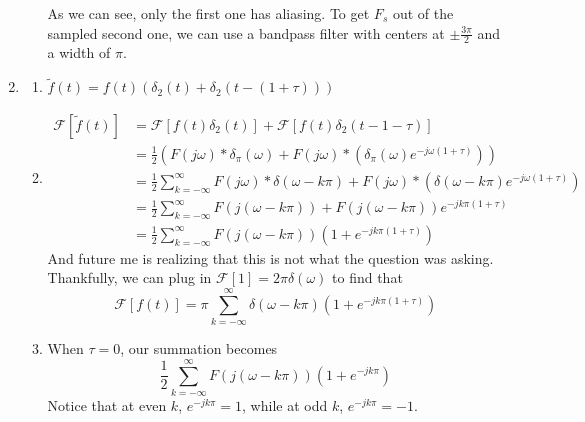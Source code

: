 \documentclass[12pt]{article}
\newcommand{\ft}[1]{\mathcal{F}\left[#1\right]}
\begin{document}
\begin{enumerate}
\begin{enumerate}
                        As we can see, only the first one has aliasing.
                        To get $F_s$ out of the sampled second one, we can use a bandpass
                        filter with centers at $\pm \frac{3\pi}{2}$ and a width of $\pi$.
            \end{enumerate}
      \item \begin{enumerate}
                  \item $\tilde{f}(t)=f(t)(\delta_2(t)+\delta_2(t-(1+\tau)))$
                  \item \[\begin{aligned}
                                    \ft{\tilde{f}(t)}
                                     & = \ft{f(t)\delta_2(t)}+\ft{f(t)\delta_2(t-1-\tau)}                                                                                           \\
                                     & = \frac{1}{2} \left(F(j\omega) * \delta_{\pi}(\omega)+F(j\omega) * \left(\delta_{\pi}(\omega)e^{-j\omega(1+\tau)}\right)\right)              \\
                                     & = \frac{1}{2} \sum_{k=-\infty}^{\infty} F(j\omega) * \delta(\omega-k\pi) + F(j\omega) * \left(\delta(\omega-k\pi)e^{-j\omega(1+\tau)}\right) \\
                                     & = \frac{1}{2} \sum_{k=-\infty}^{\infty} F(j(\omega-k\pi))+F(j(\omega-k\pi))e^{-jk\pi(1+\tau)}                                                \\
                                     & = \frac{1}{2} \sum_{k=-\infty}^{\infty} F(j(\omega-k\pi))\left(1+e^{-jk\pi(1+\tau)}\right)
                              \end{aligned}\] \label{list:2b}
                              And future me is realizing that this is not what the question was asking.
                              Thankfully, we can plug in $\ft{1}=2\pi\delta(\omega)$ to find that
                              \[\boxed{\ft{f(t)}=\pi \sum_{k=-\infty}^{\infty} \delta(\omega-k\pi)\left(1+e^{-jk\pi(1+\tau)}\right)}\]
                              
                  \item When $\tau=0$, our summation becomes
                        \[\frac{1}{2} \sum_{k=-\infty}^{\infty} F(j(\omega-k\pi))\left(1+e^{-jk\pi}\right)\]
                        Notice that at even $k$, $e^{-jk\pi}=1$, while at odd $k$, $e^{-jk\pi}=-1$.


\end{enumerate}
\end{enumerate}
\end{document}
